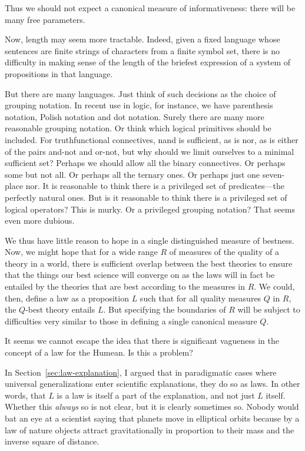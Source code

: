 Thus we should not expect a canonical measure of informativeness: there will be many free parameters.

Now, length may seem more tractable. Indeed, given a fixed language whose sentences are
finite strings of characters from a finite symbol set, there is no difficulty in making sense of the length of the briefest 
expression of a system of propositions in that language. 

But there are many languages. Just think of such decisions as the choice of grouping notation. In recent
use in logic, for instance, we have parenthesis notation, Polish notation and dot notation. Surely there are many more
reasonable grouping notation. Or think which logical primitives should be included. For truthfunctional connectives,
nand is sufficient, as is nor, as is either of the pairs and-not and or-not, but why should we limit ourselves to a minimal 
sufficient set? Perhaps we should allow all the binary connectives. Or perhaps some but not all. Or perhaps all the ternary
ones. Or perhaps just one seven-place nor. It is reasonable to think there is a privileged set of predicates---the perfectly 
natural ones. But is it reasonable to think there is a privileged set of logical operators? This is murky. Or a privileged
grouping notation? That seems even more dubious.

We thus have little reason to hope in a single distinguished measure of bestness. Now, we might hope that for a wide range $R$ 
of measures of the quality of a theory in a world, there is sufficient overlap between the best theories to ensure that
the things our best science will converge on as the laws will in fact be entailed by the theories that are best according to the 
measures in $R$. We could, then, define a law as a proposition $L$ such that for all quality measures $Q$ in $R$, the $Q$-best theory
entails $L$. But specifying the boundaries of $R$ will be subject to difficulties very similar to those in defining a single canonical 
measure $Q$.

It seems we cannot escape the idea that there is significant vagueness in the concept of a law for the Humean.
Is this a problem?

In Section~\ref{sec:law-explanation}, I argued that in paradigmatic cases where universal generalizations enter scientific 
explanations, they do so as laws. In other words, that $L$ is a law is itself a part of the explanation, and not just $L$ itself. 
Whether this \textit{always} so is not clear, but it is clearly sometimes so. Nobody would bat an eye 
at a scientist saying that planets move in elliptical orbits because
by a law of nature objects attract gravitationally in proportion to their mass and the inverse square of distance.

